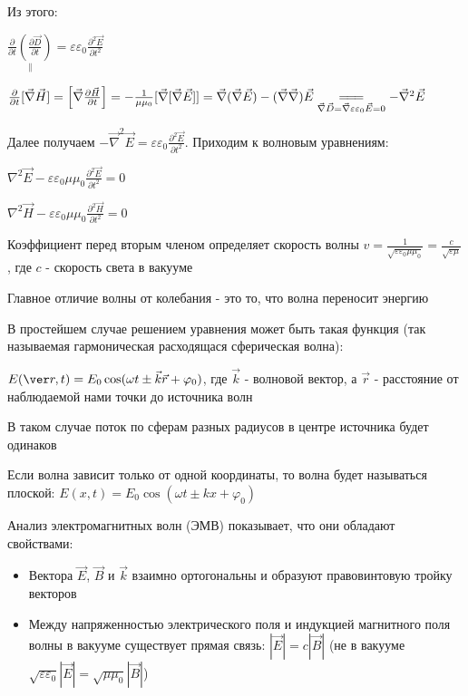 \documentclass[12pt]{article}
\begin{document}
\mediumvspace

Из этого:

$\underset{\|}{\frac{\partial}{\partial t} \left(\frac{\partial \vec D}{\partial t}\right)} = \varepsilon \varepsilon_0 \frac{\partial^2 \vec E}{\partial t^2}$

$\frac{\partial}{\partial t} [\vec \nabla \vec H] = \left[\vec \nabla \frac{\partial \vec H}{\partial t}\right] = 
- \frac{1}{\mu \mu_0} [\vec \nabla [\vec \nabla \vec E]] = \vec \nabla (\vec \nabla \vec E) - (\vec \nabla \vec \nabla) \vec E 
\underset{\vec \nabla \vec D = \vec \nabla \varepsilon \varepsilon_0 \vec E = 0}{=\joinrel=\joinrel=} -\vec \nabla^2 \vec E$

Далее получаем $-\vec \nabla^2 \vec E = \varepsilon \varepsilon_0 \frac{\partial^2 \vec E}{\partial t^2}$. 
Приходим к волновым уравнениям: 

\begin{center}
    $\nabla^2 \vec E - \varepsilon \varepsilon_0 \mu \mu_0 \frac{\partial^2 \vec E}{\partial t^2} = 0$

    $\nabla^2 \vec H - \varepsilon \varepsilon_0 \mu \mu_0 \frac{\partial^2 \vec H}{\partial t^2} = 0$
\end{center}

Коэффициент перед вторым членом определяет скорость волны $v = \frac{1}{\sqrt{\varepsilon \varepsilon_0 \mu \mu_0}} = \frac{c}{\sqrt{\varepsilon \mu}}$, где $c$ - скорость света в вакууме

Главное отличие волны от колебания - это то, что волна переносит энергию

В простейшем случае решением уравнения может быть такая функция (так называемая гармоническая расходящася сферическая волна):

$E(\ver r, t) = E_0 \cos (\omega t \pm \vec k \vec r + \varphi_0)$, где $\vec k$ - волновой вектор, а $\vec r$ - расстояние от наблюдаемой нами точки до источника волн

В таком случае поток по сферам разных радиусов в центре источника будет одинаков

Если волна зависит только от одной координаты, то волна будет называться плоской: $E(x, t) = E_0 \cos (\omega t \pm k x + \varphi_0)$

Анализ электромагнитных волн (ЭМВ) показывает, что они обладают свойствами:

\begin{itemize}
    \item Вектора $\vec E$, $\vec B$ и $\vec k$ взаимно ортогональны и образуют правовинтовую тройку векторов
    \item Между напряженностью электрического поля и индукцией магнитного поля волны в вакууме существует прямая связь:
    $|\vec E| = c |\vec B|$ (не в вакууме $\sqrt{\varepsilon \varepsilon_0} |\vec E| = \sqrt{\mu \mu_0} |\vec B|$)
\end{itemize}
\end{document}

